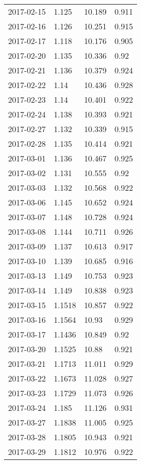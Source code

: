 \begin{center}
\begin{longtable}{r lll}
    2017-02-15 & 1.125  & 10.189 & 0.911  \\
    2017-02-16 & 1.126  & 10.251 & 0.915  \\
    2017-02-17 & 1.118  & 10.176 & 0.905  \\
    2017-02-20 & 1.135  & 10.336 & 0.92   \\
    2017-02-21 & 1.136  & 10.379 & 0.924  \\
    2017-02-22 & 1.14   & 10.436 & 0.928  \\
    2017-02-23 & 1.14   & 10.401 & 0.922  \\
    2017-02-24 & 1.138  & 10.393 & 0.921  \\
    2017-02-27 & 1.132  & 10.339 & 0.915  \\
    2017-02-28 & 1.135  & 10.414 & 0.921  \\
    2017-03-01 & 1.136  & 10.467 & 0.925  \\
    2017-03-02 & 1.131  & 10.555 & 0.92   \\
    2017-03-03 & 1.132  & 10.568 & 0.922  \\
    2017-03-06 & 1.145  & 10.652 & 0.924  \\
    2017-03-07 & 1.148  & 10.728 & 0.924  \\
    2017-03-08 & 1.144  & 10.711 & 0.926  \\
    2017-03-09 & 1.137  & 10.613 & 0.917  \\
    2017-03-10 & 1.139  & 10.685 & 0.916  \\
    2017-03-13 & 1.149  & 10.753 & 0.923  \\
    2017-03-14 & 1.149  & 10.838 & 0.923  \\
    2017-03-15 & 1.1518 & 10.857 & 0.922  \\
    2017-03-16 & 1.1564 & 10.93  & 0.929  \\
    2017-03-17 & 1.1436 & 10.849 & 0.92   \\
    2017-03-20 & 1.1525 & 10.88  & 0.921  \\
    2017-03-21 & 1.1713 & 11.011 & 0.929  \\
    2017-03-22 & 1.1673 & 11.028 & 0.927  \\
    2017-03-23 & 1.1729 & 11.073 & 0.926  \\
    2017-03-24 & 1.185  & 11.126 & 0.931  \\
    2017-03-27 & 1.1838 & 11.005 & 0.925  \\
    2017-03-28 & 1.1805 & 10.943 & 0.921  \\
    2017-03-29 & 1.1812 & 10.976 & 0.922  \\

\end{longtable}
\end{center}
